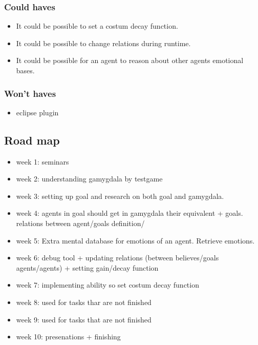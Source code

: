 \documentclass[]{article}
\begin{document}
\subsubsection*{Could haves}

\begin{itemize}
	\item It could be possible to set a costum decay function.
	\item It could be possible to change relations during runtime.
	
	\item It could be possible for an agent to reason about other agents emotional bases.
\end{itemize}

\subsubsection*{Won't haves}
\begin{itemize}
	\item eclipse plugin
\end{itemize}

\subsection{Road map}
\begin{itemize}
	\item week 1: seminars
	\item week 2: understanding gamygdala by testgame
	\item week 3: setting up goal and research on both goal and gamygdala.
	\item week 4: agents in goal should get in gamygdala their equivalent + goals. relations between agent/goals definition/
	\item week 5:  Extra mental database for emotions of an agent. Retrieve emotions.
	\item week 6: debug tool + updating relations (between believes/goals agents/agents) + setting gain/decay function
	\item week 7: implementing ability so set costum decay function
	\item week 8: used for tasks thar are not finished
	\item week 9: used for tasks that are not finished
	\item week 10: presenations + finishing
	
\end{itemize}
\end{document}
